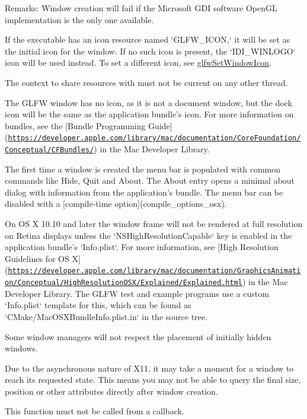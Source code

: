 \begin{Desc}
\item[Remarks:]Window creation will fail if the Microsoft GDI software OpenGL implementation is the only one available.

If the executable has an icon resource named `GLFW\_\-ICON,` it will be set as the initial icon for the window. If no such icon is present, the `IDI\_\-WINLOGO` icon will be used instead. To set a different icon, see \hyperlink{group__window_g182987a1a62a41a924842b9473d560df}{glfwSetWindowIcon}.

The context to share resources with must not be current on any other thread.

The GLFW window has no icon, as it is not a document window, but the dock icon will be the same as the application bundle's icon. For more information on bundles, see the \mbox{[}Bundle Programming Guide\mbox{]}(\href{https://developer.apple.com/library/mac/documentation/CoreFoundation/Conceptual/CFBundles/}{\tt https://developer.apple.com/library/mac/documentation/CoreFoundation/Conceptual/CFBundles/}) in the Mac Developer Library.

The first time a window is created the menu bar is populated with common commands like Hide, Quit and About. The About entry opens a minimal about dialog with information from the application's bundle. The menu bar can be disabled with a \mbox{[}compile-time option\mbox{]}(compile\_\-options\_\-osx).

On OS X 10.10 and later the window frame will not be rendered at full resolution on Retina displays unless the `NSHighResolutionCapable` key is enabled in the application bundle's `Info.plist`. For more information, see \mbox{[}High Resolution Guidelines for OS X\mbox{]}(\href{https://developer.apple.com/library/mac/documentation/GraphicsAnimation/Conceptual/HighResolutionOSX/Explained/Explained.html}{\tt https://developer.apple.com/library/mac/documentation/GraphicsAnimation/Conceptual/HighResolutionOSX/Explained/Explained.html}) in the Mac Developer Library. The GLFW test and example programs use a custom `Info.plist` template for this, which can be found as `CMake/MacOSXBundleInfo.plist.in` in the source tree.

Some window managers will not respect the placement of initially hidden windows.

Due to the asynchronous nature of X11, it may take a moment for a window to reach its requested state. This means you may not be able to query the final size, position or other attributes directly after window creation.\end{Desc}
This function must not be called from a callback.

